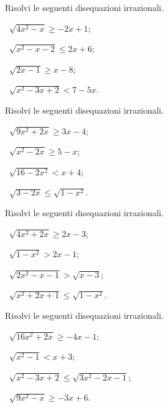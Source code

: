 \begin{esercizio}[\Ast]
 \label{ese:8.18}
Risolvi le seguenti disequazioni irrazionali.
\begin{multicols}{2}
 \begin{enumeratea}
 \item~$\sqrt{4x^2-x}\ge -2x+1$;
 \item~$\sqrt{x^2-x-2}\le 2x+6$;
 \item~$\sqrt{2x-1}\ge x-8$;
 \item~$\sqrt{x^2-3x+2}<7-5x$.
 \end{enumeratea}
 \end{multicols}
\end{esercizio}

\begin{esercizio}[\Ast]
 \label{ese:8.19}
Risolvi le seguenti disequazioni irrazionali.
\begin{multicols}{2}
 \begin{enumeratea}
 \item~$\sqrt{9x^2+2x}\ge 3x-4$;
 \item~$\sqrt{x^2-2x}\ge 5-x$;
 \item~$\sqrt{16-2x^2}<x+4$;
 \item~$\sqrt{3-2x}\le \sqrt{1-x^2}$.
 \end{enumeratea}
 \end{multicols}
\end{esercizio}

\begin{esercizio}[\Ast]
 \label{ese:8.20}
Risolvi le seguenti disequazioni irrazionali.
\begin{multicols}{2}
 \begin{enumeratea}
 \item~$\sqrt{4x^2+2x}\ge 2x-3$;
 \item~$\sqrt{1-x^2}>2x-1$;
 \item~$\sqrt{2x^2-x-1}>\sqrt{x-3}$;
 \item~$\sqrt{x^2+2x+1}\le \sqrt{1-x^2}$.
 \end{enumeratea}
 \end{multicols}
\end{esercizio}

\begin{esercizio}[\Ast]
 \label{ese:8.21}
Risolvi le seguenti disequazioni irrazionali.
\begin{multicols}{2}
 \begin{enumeratea}
 \item~$\sqrt{16x^2+2x}\ge -4x-1$;
 \item~$\sqrt{x^2-1}<x+3$;
 \item~$\sqrt{x^2-3x+2}\le \sqrt{3x^2-2x-1}$;
 \item~$\sqrt{9x^2-x}\ge -3x+6$.
 \end{enumeratea}
 \end{multicols}
\end{esercizio}

